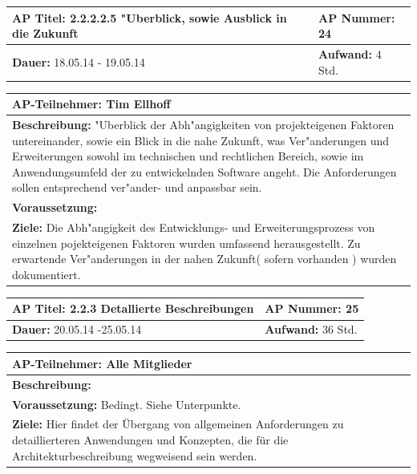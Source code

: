 \documentclass[fontsize=12pt,paper=a4,twoside]{scrartcl}
\begin{document}
\begin{tabular}{|p{7.43cm}|p{7.43cm}|}
\hline
\textbf{AP Titel: }2.2.2.2.5 "Uberblick, sowie Ausblick in die Zukunft & \textbf{AP Nummer: }24\\ 
\hline
\textbf{Dauer: }18.05.14 - 19.05.14 & \textbf{Aufwand: } 4 Std.\\
\hline
\end{tabular}
\begin{tabular}{|p{15.3cm}|}
\hline
\textbf{AP-Teilnehmer: }Tim Ellhoff\\
\hline
\textbf{Beschreibung: }"Uberblick der Abh"angigkeiten von projekteigenen Faktoren untereinander, sowie ein Blick in die nahe Zukunft, was Ver"anderungen und Erweiterungen sowohl im technischen und rechtlichen Bereich, sowie im Anwendungsumfeld der zu entwickelnden Software angeht. Die Anforderungen sollen entsprechend ver"ander-
 und anpassbar sein.\\
\hline
\textbf{Voraussetzung: }\\
\hline 
\textbf{Ziele: }Die Abh"angigkeit des Entwicklungs- und Erweiterungsprozess von einzelnen pojekteigenen Faktoren wurden umfassend herausgestellt. Zu erwartende Ver"anderungen in der nahen Zukunft( sofern vorhanden ) wurden dokumentiert.\\
\hline 
\end{tabular}

\begin{tabular}{|p{7.43cm}|p{7.43cm}|}
\hline
\textbf{AP Titel: }2.2.3 Detallierte Beschreibungen & \textbf{AP Nummer: }25\\ 
\hline
\textbf{Dauer: }20.05.14 -25.05.14 & \textbf{Aufwand: } 36 Std.\\
\hline
\end{tabular}
\begin{tabular}{|p{15.3cm}|}
\hline
\textbf{AP-Teilnehmer: }Alle Mitglieder\\
\hline
\textbf{Beschreibung: }\\
\hline
\textbf{Voraussetzung: }Bedingt. Siehe Unterpunkte.\\
\hline 
\textbf{Ziele: } Hier findet der Übergang von allgemeinen Anforderungen zu detaillierteren Anwendungen und Konzepten, die für die Architekturbeschreibung wegweisend sein werden.\\
\hline 
\end{tabular}
\end{document}
